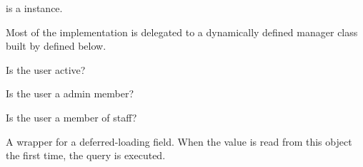 \documentclass[letterpaper,10pt,english]{sphinxmanual}
\begin{document}
\begin{fulllineitems}
\begin{fulllineitems}
 is a  instance.

Most of the implementation is delegated to a dynamically defined manager
class built by  defined below.

\end{fulllineitems}


\begin{fulllineitems}
\label{\detokenize{QuChemPedIA.models:QuChemPedIA.models.UserModel.Utilisateur.is_active}}
Is the user active?

\end{fulllineitems}


\begin{fulllineitems}
\label{\detokenize{QuChemPedIA.models:QuChemPedIA.models.UserModel.Utilisateur.is_admin}}
Is the user a admin member?

\end{fulllineitems}


\begin{fulllineitems}
\label{\detokenize{QuChemPedIA.models:QuChemPedIA.models.UserModel.Utilisateur.is_staff}}
Is the user a member of staff?

\end{fulllineitems}


\begin{fulllineitems}
\label{\detokenize{QuChemPedIA.models:QuChemPedIA.models.UserModel.Utilisateur.last_date_upload}}
A wrapper for a deferred-loading field. When the value is read from this
object the first time, the query is executed.

\end{fulllineitems}



\end{fulllineitems}
\end{document}

